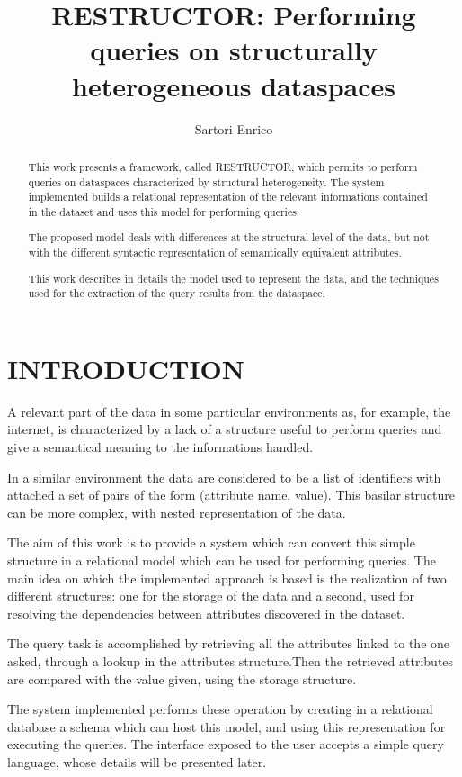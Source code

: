 \documentclass{acm_proc_article-sp-sigmod07}
\begin{document}
\title{RESTRUCTOR: Performing queries on structurally heterogeneous
dataspaces}
\author{Sartori Enrico}
\maketitle

\begin{abstract}
This work presents a framework, called RESTRUCTOR, which permits to
perform queries on dataspaces characterized by structural heterogeneity.
The system implemented builds a relational representation of the relevant
informations contained in the dataset and uses this model for performing
queries.

The proposed model deals with differences at the structural level of the
data, but not with the different syntactic representation of semantically
equivalent attributes.

This work describes in details the model used to represent the data, and
the techniques used for the extraction of the query results from the
dataspace.
\end{abstract}

\section{INTRODUCTION}
A relevant part of the data in some particular environments as, for
example, the internet, is characterized by a lack of a structure useful
to perform queries and give a semantical meaning to the informations
handled.

In a similar environment the data are considered to be a list of
identifiers with attached a set of pairs of the form (attribute name,
value). This basilar structure can be more complex, with nested
representation of the data.

The aim of this work is to provide a system which can convert this simple
structure in a relational model which can be used for performing queries.
The main idea on which the implemented approach is based is the
realization of two different structures: one for the storage of the data
and a second, used for resolving the dependencies between attributes
discovered in the dataset.

The query task is accomplished by retrieving all the attributes linked to
the one asked, through a lookup in the attributes structure.Then the
retrieved attributes are compared with the value given, using the storage
structure.

The system implemented performs these operation by creating in a
relational database a schema which can host this model, and using this
representation for executing the queries.
The interface exposed to the user accepts a simple query language, whose
details will be presented later.
\end{document}
